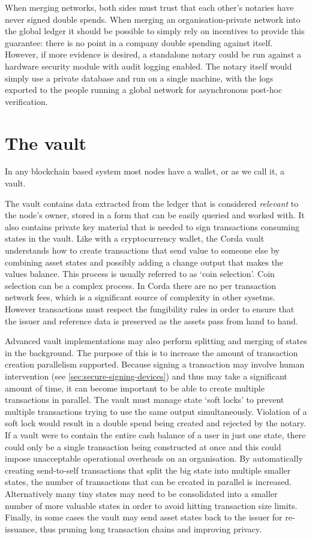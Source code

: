 \documentclass{article}
\begin{document}
When merging networks, both sides must trust that each other's notaries have never signed double spends. When merging an
organisation-private network into the global ledger it should be possible to simply rely on incentives to provide
this guarantee: there is no point in a company double spending against itself. However, if more evidence is desired, a
standalone notary could be run against a hardware security module with audit logging enabled. The notary itself would simply
use a private database and run on a single machine, with the logs exported to the people running a global network for
asynchronous post-hoc verification.

\section{The vault}\label{sec:vault}

In any blockchain based system most nodes have a wallet, or as we call it, a vault.

The vault contains data extracted from the ledger that is considered \emph{relevant} to the node's owner, stored in a form
that can be easily queried and worked with. It also contains private key material that is needed to sign transactions
consuming states in the vault. Like with a cryptocurrency wallet, the Corda vault understands how to create transactions
that send value to someone else by combining asset states and possibly adding a change output that makes the values
balance. This process is usually referred to as `coin selection'. Coin selection can be a complex process. In Corda
there are no per transaction network fees, which is a significant source of complexity in other sysetms. However
transactions must respect the fungibility rules in order to ensure that the issuer and reference data is preserved
as the assets pass from hand to hand.

Advanced vault implementations may also perform splitting and merging of states in the background. The purpose of this
is to increase the amount of transaction creation parallelism supported. Because signing a transaction may involve
human intervention (see \cref{sec:secure-signing-devices}) and thus may take a significant amount of time, it can
become important to be able to create multiple transactions in parallel. The vault must manage state `soft locks' to
prevent multiple transactions trying to use the same output simultaneously. Violation of a soft lock would result in
a double spend being created and rejected by the notary. If a vault were to contain the entire cash balance
of a user in just one state, there could only be a single transaction being constructed at once and this could
impose unacceptable operational overheads on an organisation. By automatically creating send-to-self transactions that
split the big state into multiple smaller states, the number of transactions that can be created in parallel is
increased. Alternatively many tiny states may need to be consolidated into a smaller number of more valuable states
in order to avoid hitting transaction size limits. Finally, in some cases the vault may send asset states back
to the issuer for re-issuance, thus pruning long transaction chains and improving privacy.
\end{document}
